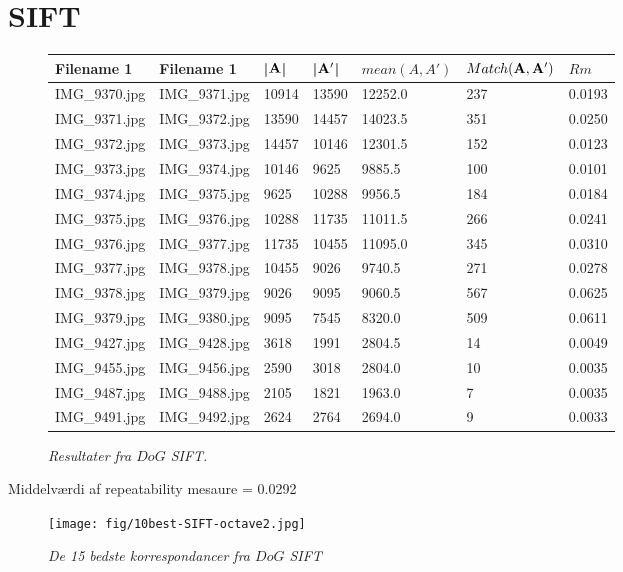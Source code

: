 \section{SIFT}
\begin{figure}[H]
    \centering
    \begin{center}    
    \begin{tabular}{ | l | l | l | l | l | l | l |}
    \hline
    Filename 1 & Filename 1 & |$\bold{A}$| & |$\bold{A'}$| & $mean(A,A')$ & $Match(\bold{A}, \bold{A}')$ & $Rm$ \\ \hline
IMG\_9370.jpg &	IMG\_9371.jpg &	10914 &	13590 &	12252.0 &	237 &	0.0193\\ \hline
IMG\_9371.jpg &	IMG\_9372.jpg &	13590 &	14457 &	14023.5 &	351 &	0.0250\\ \hline
IMG\_9372.jpg &	IMG\_9373.jpg &	14457 &	10146 &	12301.5 &	152 &	0.0123\\ \hline
IMG\_9373.jpg &	IMG\_9374.jpg &	10146 &	9625 &	9885.5 &	100 &	0.0101\\ \hline
IMG\_9374.jpg &	IMG\_9375.jpg &	9625 &	10288 &	9956.5 &	184 &	0.0184\\ \hline
IMG\_9375.jpg &	IMG\_9376.jpg &	10288 &	11735 &	11011.5 &	266 &	0.0241\\ \hline
IMG\_9376.jpg &	IMG\_9377.jpg &	11735 &	10455 &	11095.0 &	345 &	0.0310\\ \hline
IMG\_9377.jpg &	IMG\_9378.jpg &	10455 &	9026 &	9740.5 &	271 &	0.0278\\ \hline
IMG\_9378.jpg &	IMG\_9379.jpg &	9026 &	9095 &	9060.5 &	567 &	0.0625\\ \hline
IMG\_9379.jpg &	IMG\_9380.jpg &	9095 &	7545 &	8320.0 &	509 &	0.0611\\ \hline
IMG\_9427.jpg &	IMG\_9428.jpg &	3618 &	1991 &	2804.5 &	14 &	0.0049\\ \hline
IMG\_9455.jpg &	IMG\_9456.jpg &	2590 &	3018 &	2804.0 &	10 &	0.0035\\ \hline
IMG\_9487.jpg &	IMG\_9488.jpg &	2105 &	1821 &	1963.0 &	7 &		0.0035\\ \hline
IMG\_9491.jpg &	IMG\_9492.jpg &	2624 &	2764 &	2694.0 &	9 &		0.0033\\ \hline

    \end{tabular}       
    \caption{{\footnotesize \textit{Resultater fra $DoG$ SIFT.}}}
    \label{tab:SURFOCTAVE2}
     \end{center}
     \vspace{-2.5em}
\end{figure} \noindent
Middelværdi af repeatability mesaure = 0.0292
\begin{figure}[H]
    \centering
    \texttt{[image: fig/10best-SIFT-octave2.jpg]}
    \vspace{-0.5em}   
    \begin{center}
    \caption{{\footnotesize \textit{
    De 15 bedste korrespondancer fra $DoG$ SIFT}}}
    \label{fig:sifsif}
     \end{center}
  \end{figure}
       \vspace{-2.7em}
\noindent

